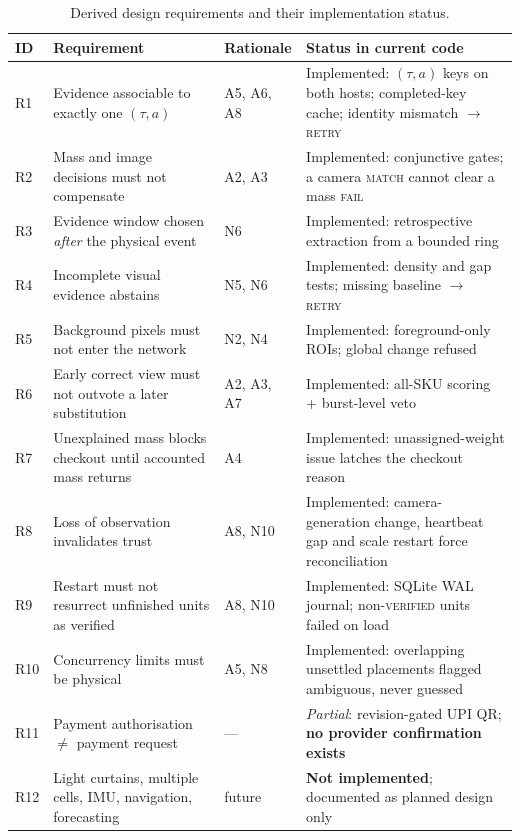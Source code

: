 \documentclass[conference]{IEEEtran}
\begin{document}
\begin{table}[!t]
\caption{Derived design requirements and their implementation status.}
\label{tab:req}
\centering
\footnotesize
\renewcommand{\arraystretch}{1.2}
\begin{tabular}{@{}p{}p{}p{}p{}@{}}
\toprule
ID & Requirement & Rationale & Status in current code \\
\midrule
R1 & Evidence associable to exactly one $(\tau,a)$ & A5, A6, A8 & Implemented: $(\tau,a)$ keys on both hosts; completed-key cache; identity mismatch $\rightarrow$ \textsc{retry} \\
R2 & Mass and image decisions must not compensate & A2, A3 & Implemented: conjunctive gates; a camera \textsc{match} cannot clear a mass \textsc{fail} \\
R3 & Evidence window chosen \emph{after} the physical event & N6 & Implemented: retrospective extraction from a bounded ring \\
R4 & Incomplete visual evidence abstains & N5, N6 & Implemented: density and gap tests; missing baseline $\rightarrow$ \textsc{retry} \\
R5 & Background pixels must not enter the network & N2, N4 & Implemented: foreground-only ROIs; global change refused \\
R6 & Early correct view must not outvote a later substitution & A2, A3, A7 & Implemented: all-SKU scoring + burst-level veto \\
R7 & Unexplained mass blocks checkout until accounted mass returns & A4 & Implemented: unassigned-weight issue latches the checkout reason \\
R8 & Loss of observation invalidates trust & A8, N10 & Implemented: camera-generation change, heartbeat gap and scale restart force reconciliation \\
R9 & Restart must not resurrect unfinished units as verified & A8, N10 & Implemented: SQLite WAL journal; non-\textsc{verified} units failed on load \\
R10 & Concurrency limits must be physical & A5, N8 & Implemented: overlapping unsettled placements flagged ambiguous, never guessed \\
R11 & Payment authorisation $\neq$ payment request & --- & \emph{Partial}: revision-gated UPI QR; \textbf{no provider confirmation exists} \\
R12 & Light curtains, multiple cells, IMU, navigation, forecasting & future & \textbf{Not implemented}; documented as planned design only \\
\bottomrule
\end{tabular}
\end{table}
\end{document}
